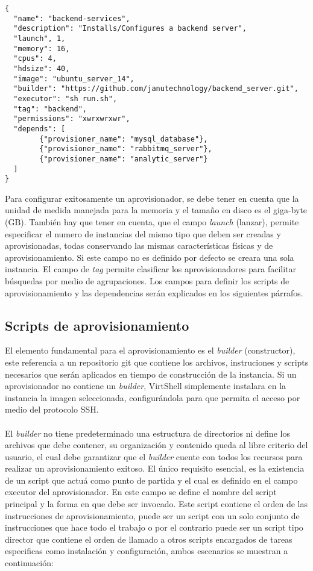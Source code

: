 \vspace{5mm}

\begin{lstlisting}[style=json, caption=Estructura de un aprovisionador]
{
  "name": "backend-services",
  "description": "Installs/Configures a backend server",
  "launch", 1,
  "memory": 16,
  "cpus": 4,
  "hdsize": 40,
  "image": "ubuntu_server_14",
  "builder": "https://github.com/janutechnology/backend_server.git",
  "executor": "sh run.sh",
  "tag": "backend",
  "permissions": "xwrxwrxwr",
  "depends": [
        {"provisioner_name": "mysql_database"},
        {"provisioner_name": "rabbitmq_server"},
        {"provisioner_name": "analytic_server"}
  ]
}
\end{lstlisting}

\vspace{5mm}

Para configurar exitosamente un aprovisionador, se debe tener en cuenta que la unidad de medida manejada para la memoria y el tamaño en disco es el giga-byte (GB). También hay que tener en cuenta, que el campo \emph{launch} (lanzar), permite especificar el numero de instancias del mismo tipo que deben ser creadas y aprovisionadas, todas conservando las mismas características físicas y de aprovisionamiento. Si este campo no es definido por defecto se creara una sola instancia. El campo de \emph{tag} permite clasificar los aprovisionadores para facilitar búsquedas por medio de agrupaciones. Los campos para definir los scripts de aprovisionamiento y las dependencias serán explicados en los siguientes párrafos.

\subsection{Scripts de aprovisionamiento}
El elemento fundamental para el aprovisionamiento es el \emph{builder} (constructor), este referencia a un repositorio git que contiene los archivos, instruciones y scripts necesarios que serán aplicados en tiempo de construcción de la instancia. Si un aprovisionador no contiene un \emph{builder}, VirtShell simplemente instalara en la instancia la imagen seleccionada, configurándola para que permita el acceso por medio del protocolo SSH.\\
\\
El \emph{builder} no tiene predeterminado una estructura de directorios ni define los archivos que debe contener, su organización y contenido queda al libre criterio del usuario, el cual debe garantizar que el \emph{builder} cuente con todos los recursos para realizar un aprovisionamiento exitoso. El único requisito esencial, es la existencia de un script que actuá como punto de partida y el cual es definido en el campo executor del aprovisionador. En este campo se define el nombre del script principal y la forma en que debe ser invocado. Este script contiene el orden de las instrucciones de aprovisionamiento, puede ser un script con un solo conjunto de instrucciones que hace todo el trabajo o por el contrario puede ser un script tipo director que contiene el orden de llamado a otros scripts encargados de tareas especificas como instalación y configuración, ambos escenarios se muestran a continuación:

